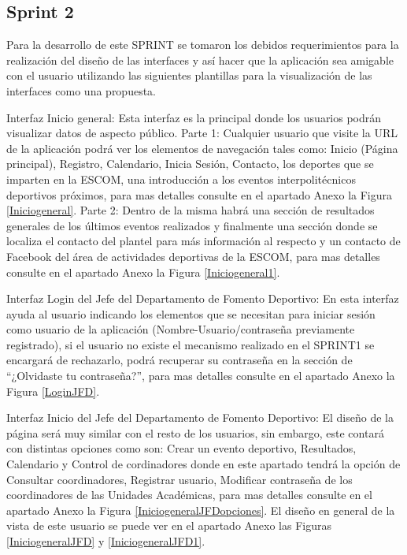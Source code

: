 	
	\subsection{Sprint 2}
	\noindent Para la desarrollo de este SPRINT se tomaron los debidos requerimientos para la realización del diseño de las interfaces y así hacer que la aplicación sea amigable con el usuario utilizando las siguientes plantillas para la visualización de las interfaces como una propuesta.
	\newline
	
	\noindent Interfaz Inicio general: Esta interfaz es la principal donde los usuarios podrán visualizar datos de aspecto público. 
	\newline
	Parte 1:
	Cualquier usuario que visite la URL de la aplicación podrá ver los elementos de navegación tales como: Inicio (Página principal), Registro, Calendario, Inicia Sesión, Contacto, los deportes que se imparten en la ESCOM, una introducción a los eventos interpolitécnicos deportivos próximos, para mas detalles consulte en el apartado Anexo la Figura \ref{Iniciogeneral}.
	\newline
	Parte 2:
	Dentro de la misma habrá una sección de resultados generales de los últimos eventos realizados y finalmente una  sección donde se localiza el contacto del plantel para más información al respecto y un contacto de Facebook del área de actividades deportivas de la ESCOM, para mas detalles consulte en el apartado Anexo la Figura \ref{Iniciogeneral1}.
	\newline
	
	\noindent Interfaz Login del Jefe del Departamento de Fomento Deportivo: En esta interfaz ayuda al usuario indicando los elementos que se necesitan para iniciar sesión como usuario de la aplicación (Nombre-Usuario/contraseña previamente registrado), si el usuario no existe el mecanismo realizado en el SPRINT1 se encargará de rechazarlo, podrá recuperar su contraseña en la sección de “¿Olvidaste tu contraseña?”, para mas detalles consulte en el apartado Anexo la Figura 	\ref{LoginJFD}. 
	\newline
	
	\noindent Interfaz Inicio del Jefe del Departamento de Fomento Deportivo: El diseño de la página será muy similar con el resto de los usuarios, sin embargo, este contará con distintas opciones como son: Crear un evento deportivo, Resultados, Calendario y Control de cordinadores donde en este apartado tendrá la opción de Consultar coordinadores, Registrar usuario, Modificar contraseña de los coordinadores de las Unidades Académicas, para mas detalles consulte en el apartado Anexo la Figura 	\ref{IniciogeneralJFDopciones}. El diseño en general de la vista de este usuario se puede ver en el apartado Anexo las Figuras \ref{IniciogeneralJFD} y \ref{IniciogeneralJFD1}.
	\newline
	
